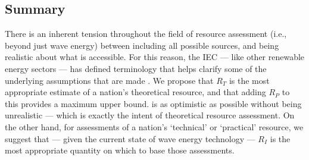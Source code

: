 \subsection{Summary\DIFdelbegin {}\DIFdelend }

There is an inherent tension throughout the field of resource assessment (i.e., beyond just wave energy) between including all possible sources, and being realistic about what is accessible. For this reason, the IEC — like other renewable energy sectors — has defined terminology that helps clarify some of the underlying assumptions that are made \citep[][]{internationalelectrotechnicalcommissionPartTerminologyEdition2020}. We propose that $R_T$ is the most appropriate estimate of a nation's theoretical resource, and that adding $R_P$ to this provides a maximum upper bound. \DIFdelbegin {}\DIFdelend \DIFaddbegin {}\DIFaddend is as optimistic as possible without being unrealistic — which is exactly the intent of theoretical resource assessment.  On the other hand, for assessments of a nation's `technical' or `practical' resource, we suggest that — given the current state of wave energy technology — $R_I$ is the most appropriate quantity on which to base those assessments.

